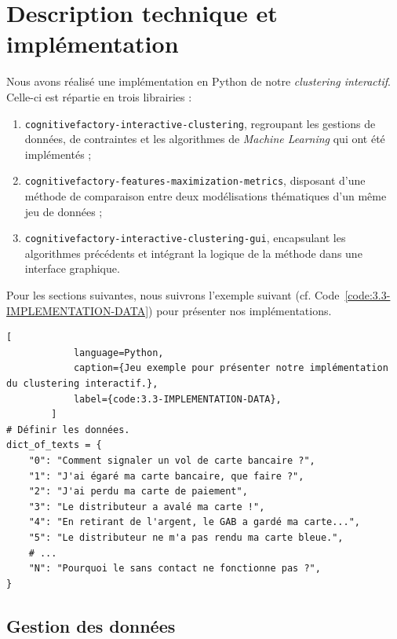 		
    \section{Description technique et implémentation}
	\label{section:3.3-DESCRIPTION-IMPLEMENTATION}
		
		Nous avons réalisé une implémentation en Python de notre \textit{clustering interactif}. Celle-ci est répartie en trois librairies :
		\begin{enumerate}
			\item \texttt{cognitivefactory-interactive-clustering}, regroupant les gestions de données, de contraintes et les algorithmes de \textit{Machine Learning} qui ont été implémentés ;
			\item \texttt{cognitivefactory-features-maximization-metrics}, disposant d'une méthode de comparaison entre deux modélisations thématiques d'un même jeu de données ;
			\item \texttt{cognitivefactory-interactive-clustering-gui}, encapsulant les algorithmes précédents et intégrant la logique de la méthode dans une interface graphique.
		\end{enumerate}
		
		Pour les sections suivantes, nous suivrons l'exemple suivant (cf. Code~\ref{code:3.3-IMPLEMENTATION-DATA}) pour présenter nos implémentations.
		
		\begin{lstlisting}[
			language=Python,
			caption={Jeu exemple pour présenter notre implémentation du clustering interactif.},
			label={code:3.3-IMPLEMENTATION-DATA},
		]
# Définir les données.
dict_of_texts = {
    "0": "Comment signaler un vol de carte bancaire ?",
    "1": "J'ai égaré ma carte bancaire, que faire ?",
    "2": "J'ai perdu ma carte de paiement",
    "3": "Le distributeur a avalé ma carte !",
    "4": "En retirant de l'argent, le GAB a gardé ma carte...",
    "5": "Le distributeur ne m'a pas rendu ma carte bleue.",
    # ...
    "N": "Pourquoi le sans contact ne fonctionne pas ?",
}
		\end{lstlisting}
		
		
		\subsection{Gestion des données}
		\label{section:3.3.1-GESTION-DES-DONNEES}
				
